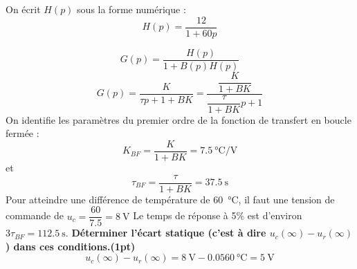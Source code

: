 On écrit $H(p)$ sous la forme numérique :
\[
    H(p)=\dfrac{12}{1+60p}
\]

\question{}
\[
    G(p)=\dfrac{H(p)}{1+B(p)H(p)}
\]
\[
    G(p)=\dfrac{K}{\tau p+1+BK}=\dfrac{\dfrac{K}{1+BK}}{\dfrac{\tau}{1+BK}p+1}
\]
On identifie les paramètres du premier ordre de la fonction de transfert en 
boucle fermée :
\[
    K_{BF}=\dfrac{K}{1+BK}=\SI{7.5}{\celsius\per\volt}
\]
et
\[
    \tau_{BF}=\dfrac{\tau}{1+BK}=\SI{37.5}{\second}
\]
\question{}
Pour atteindre une différence de température de \SI{60}{\celsius}, il faut une 
tension de commande de $u_c=\dfrac{60}{7.5}=\SI{8}{\volt}$
Le temps de réponse à 5\% est d'environ $3\tau_{BF}=\SI{112.5}{\second}$.
\question{}
\textbf{Déterminer l'écart statique (c'est à dire $u_c(\infty)-u_r(\infty)$) 
dans ces conditions.\textbf{(1pt)}}
\[
    u_c(\infty)-u_r(\infty)=\SI{8}{\volt}-0.05\SI{60}{\celsius}=\SI{5}{\volt}
\]
